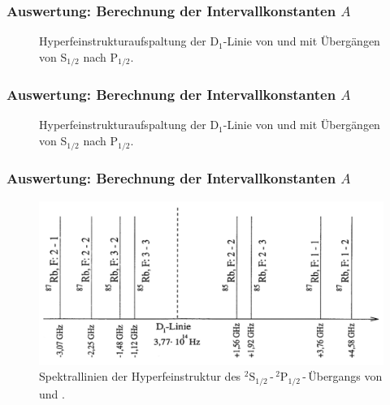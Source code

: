 \begin{frame}
\frametitle{Auswertung: Berechnung der Intervallkonstanten $A$}
\begin{figure}
    \centering
    \def\svgwidth{\textwidth}
    
    \caption{Hyperfeinstrukturaufspaltung der D$_1$-Linie von 
     und  mit Übergängen von S$_{1/2}$ nach P$_{1/2}.$}
\end{figure}
\end{frame}


\begin{frame}
\frametitle{Auswertung: Berechnung der Intervallkonstanten $A$}
\begin{figure}
    \centering
    \def\svgwidth{\textwidth}
    
    \caption{Hyperfeinstrukturaufspaltung der D$_1$-Linie von 
     und  mit Übergängen von S$_{1/2}$ nach P$_{1/2}.$}
\end{figure}
\end{frame}


\begin{frame}
\frametitle{Auswertung: Berechnung der Intervallkonstanten $A$}
\begin{figure}
    \centering
    \includegraphics[width=\textwidth]{../img/HFSspect_theo.png}
    \caption{Spektrallinien der Hyperfeinstruktur des ${}^2\text{S}_{1/2}$\,-\,${}^2\text{P}_{1/2}$\,-\,Übergangs
    von  und .}  %
\end{figure}
\end{frame}


